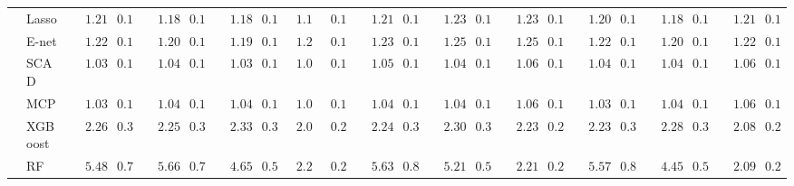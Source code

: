 \begin{tabular}{p{0.2cm}p{1cm}|p{0.6cm}p{0.6cm}|p{0.6cm}p{0.6cm}p{0.6cm}p{0.6cm}p{0.6cm}p{0.6cm}|p{0.6cm}p{0.6cm}p{0.6cm}p{0.6cm}p{0.6cm}p{0.6cm}|p{0.6cm}p{0.6cm}p{0.6cm}p{0.6cm}p{0.6cm}p{0.6cm}}
 & Lasso  & $\phantom{00}1.21$ & $\phantom{0}0.16$ & $\phantom{00}1.18$ & $\phantom{0}0.12$ & $\phantom{00}1.18$ & $\phantom{0}0.15$ & $\phantom{0}1.18$ & $\phantom{0}0.13$ & $\phantom{00}1.21$ & $\phantom{0}0.17$ & $\phantom{00}1.23$ & $\phantom{0}0.15$ & $\phantom{00}1.23$ & $\phantom{0}0.15$ & $\phantom{00}1.20$ & $\phantom{0}0.14$ & $\phantom{00}1.18$ & $\phantom{0}0.15$ & $\phantom{00}1.21$ & $\phantom{0}0.16$ \\
 & E-net  & $\phantom{00}1.22$ & $\phantom{0}0.17$ & $\phantom{00}1.20$ & $\phantom{0}0.13$ & $\phantom{00}1.19$ & $\phantom{0}0.15$ & $\phantom{0}1.20$ & $\phantom{0}0.13$ & $\phantom{00}1.23$ & $\phantom{0}0.17$ & $\phantom{00}1.25$ & $\phantom{0}0.15$ & $\phantom{00}1.25$ & $\phantom{0}0.15$ & $\phantom{00}1.22$ & $\phantom{0}0.14$ & $\phantom{00}1.20$ & $\phantom{0}0.15$ & $\phantom{00}1.22$ & $\phantom{0}0.16$ \\
 & SCAD  & $\phantom{00}1.03$ & $\phantom{0}0.12$ & $\phantom{00}1.04$ & $\phantom{0}0.11$ & $\phantom{00}1.03$ & $\phantom{0}0.11$ & $\phantom{0}1.05$ & $\phantom{0}0.12$ & $\phantom{00}1.05$ & $\phantom{0}0.11$ & $\phantom{00}1.04$ & $\phantom{0}0.11$ & $\phantom{00}1.06$ & $\phantom{0}0.11$ & $\phantom{00}1.04$ & $\phantom{0}0.11$ & $\phantom{00}1.04$ & $\phantom{0}0.12$ & $\phantom{00}1.06$ & $\phantom{0}0.11$ \\
 & MCP  & $\phantom{00}1.03$ & $\phantom{0}0.12$ & $\phantom{00}1.04$ & $\phantom{0}0.11$ & $\phantom{00}1.04$ & $\phantom{0}0.12$ & $\phantom{0}1.05$ & $\phantom{0}0.12$ & $\phantom{00}1.04$ & $\phantom{0}0.11$ & $\phantom{00}1.04$ & $\phantom{0}0.11$ & $\phantom{00}1.06$ & $\phantom{0}0.11$ & $\phantom{00}1.03$ & $\phantom{0}0.11$ & $\phantom{00}1.04$ & $\phantom{0}0.12$ & $\phantom{00}1.06$ & $\phantom{0}0.12$ \\
 & XGBoost  & $\phantom{00}2.26$ & $\phantom{0}0.33$ & $\phantom{00}2.25$ & $\phantom{0}0.33$ & $\phantom{00}2.33$ & $\phantom{0}0.33$ & $\phantom{0}2.05$ & $\phantom{0}0.25$ & $\phantom{00}2.24$ & $\phantom{0}0.32$ & $\phantom{00}2.30$ & $\phantom{0}0.34$ & $\phantom{00}2.23$ & $\phantom{0}0.26$ & $\phantom{00}2.23$ & $\phantom{0}0.31$ & $\phantom{00}2.28$ & $\phantom{0}0.34$ & $\phantom{00}2.08$ & $\phantom{0}0.28$ \\
 & RF  & $\phantom{00}5.48$ & $\phantom{0}0.77$ & $\phantom{00}5.66$ & $\phantom{0}0.75$ & $\phantom{00}4.65$ & $\phantom{0}0.53$ & $\phantom{0}2.21$ & $\phantom{0}0.25$ & $\phantom{00}5.63$ & $\phantom{0}0.81$ & $\phantom{00}5.21$ & $\phantom{0}0.56$ & $\phantom{00}2.21$ & $\phantom{0}0.25$ & $\phantom{00}5.57$ & $\phantom{0}0.80$ & $\phantom{00}4.45$ & $\phantom{0}0.58$ & $\phantom{00}2.09$ & $\phantom{0}0.23$ \\

\end{tabular}
